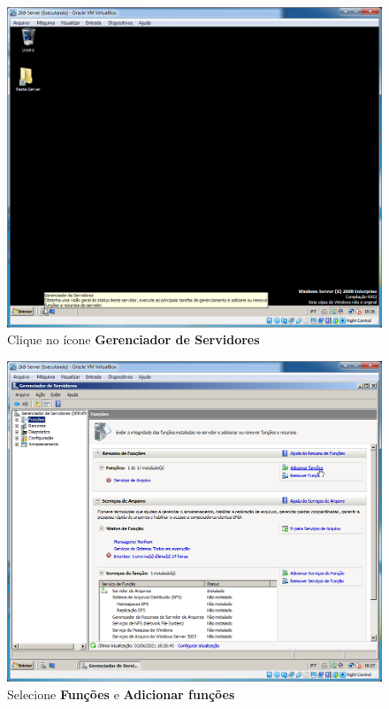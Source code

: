 \documentclass[10pt]{article}
\begin{document}
\begin{figure}[H]
    \centering
    \caption{Clique no ícone \textbf{Gerenciador de Servidores}}
    \label{fig:DNS001}
    \includegraphics[width=\linewidth]{images/windows_server/dns/001.png}
\end{figure}
\begin{figure}[H]
    \centering
    \caption{Selecione \textbf{Funções} e \textbf{Adicionar funções}}
    \label{fig:DNS003}
    \includegraphics[width=\linewidth]{images/windows_server/dns/003.png}
\end{figure}
\end{document}
